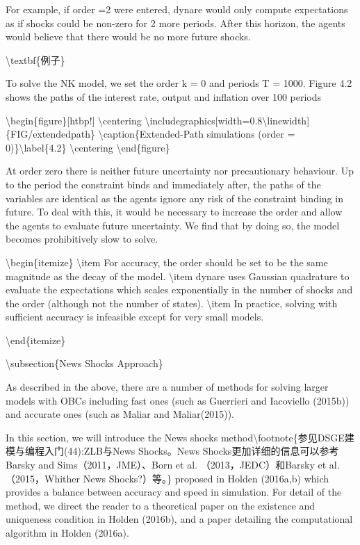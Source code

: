 \documentclass[10pt,math=newtx,citestyle=gb7714-2015,bibstyle=gb7714-2015]{elegantbook}
\begin{document}
	For example, if order =2 were entered, dynare would only compute expectations as if shocks could be non-zero for 2 more periods. After this horizon, the agents would believe that there would be no more future shocks.
	
	\textbackslash{}textbf\{例子\}
	
	To solve the NK model, we set the order k = 0 and periods T = 1000. Figure 4.2 shows the paths of the interest rate, output and inflation over 100 periods
	
	\textbackslash{}begin\{figure\}[htbp!]
	\textbackslash{}centering
	\textbackslash{}includegraphics[width=0.8\textbackslash{}linewidth]\{FIG/extendedpath\}
	\textbackslash{}caption\{Extended-Path simulations (order = 0)\}\textbackslash{}label\{4.2\}
	\textbackslash{}centering
	\textbackslash{}end\{figure\}
	
	At order zero there is neither future uncertainty nor precautionary behaviour. Up to the period the constraint binds and immediately after, the paths of the variables are identical as the agents ignore any risk of the constraint binding in
	future. To deal with this, it would be necessary to increase the order and allow the agents to evaluate future uncertainty. We find that by doing so, the model becomes prohibitively slow to solve.
	
	\textbackslash{}begin\{itemize\}
	\textbackslash{}item For accuracy, the order should be set to be the same magnitude as the decay of the model.
	\textbackslash{}item dynare uses Gaussian quadrature to evaluate the expectations which scales exponentially in the number of shocks and the order (although not the number of states).
	\textbackslash{}item In practice, solving with sufficient accuracy is infeasible except for very small models.
	
	\textbackslash{}end\{itemize\}
	
	
	\textbackslash{}subsection\{News Shocks Approach\}
	
	As described in the above, there are a number of methods for solving larger models with OBCs including fast ones (such as Guerrieri and Iacoviello (2015b)) and accurate ones (such as Maliar and Maliar(2015)).
	
	In this section, we will introduce the News shocks method\textbackslash{}footnote\{参见DSGE建模与编程入门(44):ZLB与News Shocks。News Shocks更加详细的信息可以参考Barsky and Sims（2011，JME）、Born et al. （2013，JEDC）和Barsky et al. （2015，Whither News Shocks?）等。\} proposed in Holden (2016a,b) which provides a balance between accuracy and speed in simulation. For detail of the method, we direct the reader to a theoretical paper on the existence and uniqueness condition in Holden (2016b), and a paper detailing the computational algorithm in Holden (2016a).
	
\end{document}
